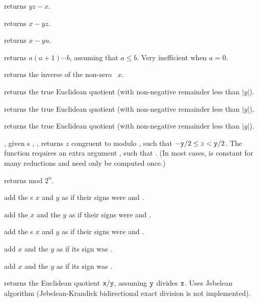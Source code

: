  returns $yz - x$.

 returns $x - yz$.

 returns $x -yu$.

 returns $a(a+1)\cdots b$, assuming
that $a \leq b$. Very inefficient when $a = 0$.

 returns the inverse of the non-zero ~$x$.

 returns the true Euclidean quotient
(with non-negative remainder less than $|y|$).

 returns the true Euclidean quotient
(with non-negative remainder less than $|y|$).

 returns the true Euclidean quotient
(with non-negative remainder less than $|y|$).

, given
s , , returns $z$ congruent to  modulo ,
such that $-{\tt y}/2 \leq z < {\tt y}/2$. The function requires an extra
argument , such that . (In most cases, 
is constant for many reductions and  need only be computed once.)

 returns  mod $2^n$.

 add the s
$x$ and $y$ as if their signs were  and .

add the  $x$ and the  $y$ as if their signs were 
and .

 add the s $x$
and $y$ as if their signs were  and .

 add $x$ and the  $y$
as if its sign was .

 add $x$ and the  $y$
as if its sign was .


 returns the Euclidean quotient
${\tt x} / {\tt y}$, assuming ${\tt y}$ divides ${\tt x}$. Uses Jebelean
algorithm (Jebelean-Krandick bidirectional exact division is not
implemented).

